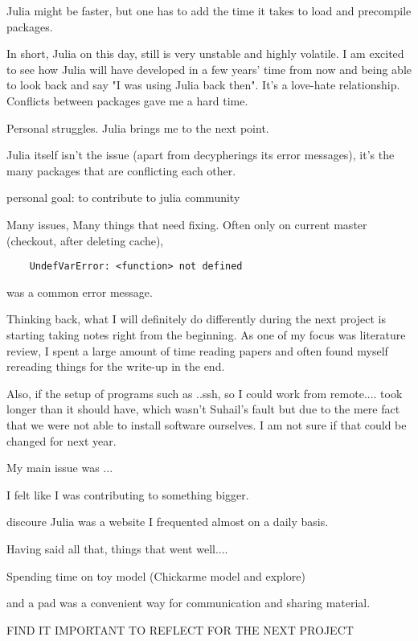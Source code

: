 \documentclass[journal, a4paper]{IEEEtran}
\begin{document}
Julia might be faster, but one has to add the time it takes to load and precompile packages.

In short, Julia on this day, still is very unstable and highly volatile. I am excited to see how Julia will have developed in a few years' time from now and being able to look back and say "I was using Julia back then". It's a love-hate relationship. 
Conflicts between packages gave me a hard time. 

Personal struggles.
Julia brings me to the next point. 

Julia itself isn't the issue (apart from decypherings its error messages), it's the many packages that are conflicting each other.


personal goal: to contribute to julia community 


Many issues, Many things that need fixing.
Often only on current master (checkout, after deleting cache), \begin{verbatim}
	UndefVarError: <function> not defined
\end{verbatim}
was a common error message.

Thinking back, what I will definitely do differently during the next project is starting taking notes right from the beginning. As one of my focus was literature review, I spent a large amount of time reading papers and often found myself rereading things for the write-up in the end.


Also, if the setup of programs such as ..ssh, so I could work from remote.... took longer than it should have, which wasn't Suhail's fault but due to the mere fact that we were not able to install software ourselves. I am not sure if that could be changed for next year. 

My main issue was ...

I felt like I was contributing to something bigger.

discoure Julia was a website I frequented almost on a daily basis. 



Having said all that, things that went well....


Spending time on toy model (Chickarme model and explore)



and a pad was a convenient way for communication and sharing material. 


FIND IT IMPORTANT TO REFLECT FOR THE NEXT PROJECT
\end{document}
